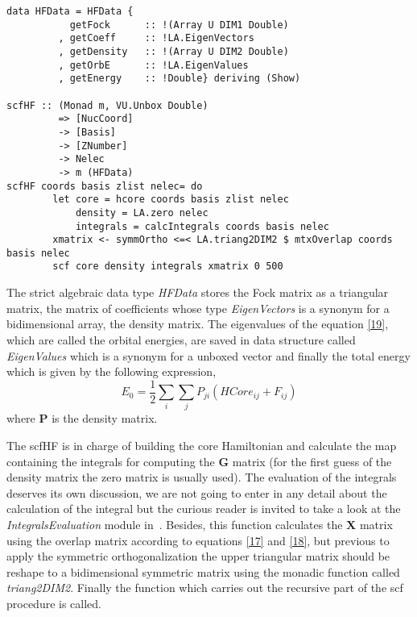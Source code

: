 \documentclass{tmr}
\begin{document}
\begin{lstlisting}[float,captionpos=b,belowcaptionskip=4pt, caption= The Interface function]
data HFData = HFData {
           getFock      :: !(Array U DIM1 Double)
         , getCoeff     :: !LA.EigenVectors 
         , getDensity   :: !(Array U DIM2 Double)
         , getOrbE      :: !LA.EigenValues
         , getEnergy    :: !Double} deriving (Show)

scfHF :: (Monad m, VU.Unbox Double)
         => [NucCoord] 
         -> [Basis]
         -> [ZNumber]
         -> Nelec
         -> m (HFData)
scfHF coords basis zlist nelec= do 
        let core = hcore coords basis zlist nelec
            density = LA.zero nelec
            integrals = calcIntegrals coords basis nelec           
        xmatrix <- symmOrtho <=< LA.triang2DIM2 $ mtxOverlap coords basis nelec
        scf core density integrals xmatrix 0 500

\end{lstlisting}

The strict algebraic data type \textit{HFData} stores the Fock matrix as a triangular matrix, 
the matrix of coefficients whose type \textit{EigenVectors} is a synonym for a bidimensional array,
 the density matrix. The eigenvalues of the equation \eqref{19}, which are called the orbital energies,
 are saved in data structure called 
\textit{EigenValues} which is a synonym for a unboxed vector and finally 
the total energy which is given by the following expression,
\begin{equation}\label{28}
E_{0} = \frac{1}{2} \sum_{i}\sum_{j} P_{ji}(HCore_{ij} + F_{ij})
\end{equation}
where \textbf{P} is the density matrix.

The scfHF is in charge of building the core Hamiltonian and calculate the map containing
the integrals for computing the \textbf{G} matrix (for the first guess of 
the density matrix the zero matrix is usually used). The evaluation of the integrals 
deserves its own discussion, we are not going to enter in any detail 
about the calculation of the integral but the curious reader is 
invited to take a look at the \textit{IntegralsEvaluation}
module in~\cite{AngelyFelipe}. Besides, this function calculates the 
\textbf{X} matrix using the overlap matrix according to equations \eqref{17}
and \eqref{18}, but previous to apply the symmetric orthogonalization the upper triangular matrix
should be reshape to a bidimensional symmetric matrix using the monadic function
called \textit{triang2DIM2}. Finally the function which carries out the recursive part of
the scf procedure is called. 
\end{document}
